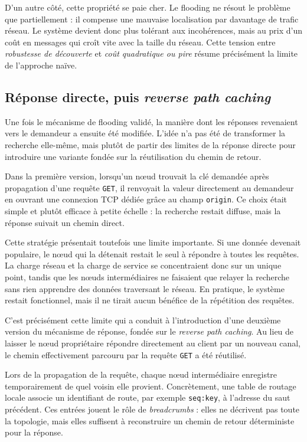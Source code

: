 D'un autre côté, cette propriété se paie cher. Le flooding ne résout le problème que partiellement : il compense une mauvaise localisation par davantage de trafic réseau. Le système devient donc plus tolérant aux incohérences, mais au prix d'un coût en messages qui croît vite avec la taille du réseau. Cette tension entre \emph{robustesse de découverte} et \emph{coût quadratique ou pire} résume précisément la limite de l'approche naïve.

\subsection{Réponse directe, puis \textit{reverse path caching}}

Une fois le mécanisme de flooding validé, la manière dont les réponses revenaient vers le demandeur a ensuite été modifiée. L'idée n'a pas été de transformer la recherche elle-même, mais plutôt de partir des limites de la réponse directe pour introduire une variante fondée sur la réutilisation du chemin de retour.

Dans la première version, lorsqu'un n\oe ud trouvait la clé demandée après propagation d'une requête \texttt{GET}, il renvoyait la valeur directement au demandeur en ouvrant une connexion TCP dédiée grâce au champ \texttt{origin}. Ce choix était simple et plutôt efficace à petite échelle : la recherche restait diffuse, mais la réponse suivait un chemin direct.

Cette stratégie présentait toutefois une limite importante. Si une donnée devenait populaire, le n\oe ud qui la détenait restait le seul à répondre à toutes les requêtes. La charge réseau et la charge de service se concentraient donc sur un unique point, tandis que les n\oe uds intermédiaires ne faisaient que relayer la recherche sans rien apprendre des données traversant le réseau. En pratique, le système restait fonctionnel, mais il ne tirait aucun bénéfice de la répétition des requêtes.

C'est précisément cette limite qui a conduit à l'introduction d'une deuxième version du mécanisme de réponse, fondée sur le \textit{reverse path caching}. Au lieu de laisser le n\oe ud propriétaire répondre directement au client par un nouveau canal, le chemin effectivement parcouru par la requête \texttt{GET} a été réutilisé.

Lors de la propagation de la requête, chaque n\oe ud intermédiaire enregistre temporairement de quel voisin elle provient. Concrètement, une table de routage locale associe un identifiant de route, par exemple \texttt{seq:key}, à l'adresse du saut précédent. Ces entrées jouent le rôle de \textit{breadcrumbs} : elles ne décrivent pas toute la topologie, mais elles suffisent à reconstruire un chemin de retour déterministe pour la réponse.


